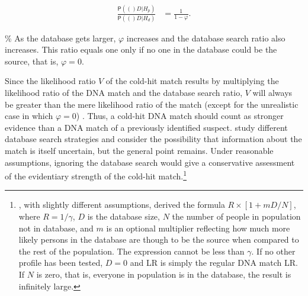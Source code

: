 \documentclass[10pt,dvipsnames,enabledeprecatedfontcommands]{scrartcl}
\newcommand{\pr}[1]{\mathsf{P}(#1)}
\begin{document}
\begin{align*}
\frac{\pr(D\vert H_p)}{\pr(D\vert H_d)} & = \frac{1}{1-\varphi}.
\end{align*}

\% As the database gets larger, \(\varphi\) increases and the database
search ratio also increases. This ratio equals one only if no one in the
database could be the source, that is, \(\varphi=0\).

Since the likelihood ratio \(V\) of the cold-hit match results by
multiplying the likelihood ratio of the DNA match and the database
search ratio, \(V\) will always be greater than the mere likelihood
ratio of the match (except for the unrealistic case in which
\(\varphi=0\)) . Thus, a cold-hit DNA match should count as stronger
evidence than a DNA match of a previously identified suspect.
\citet{dawid1996CoherentAnalysisForensic} study different database
search strategies and consider the possibility that information about
the match is itself uncertain, but the general point remains. Under
reasonable assumptions, ignoring the database search would give a
conservative assessment of the evidentiary strength of the cold-hit
match.\footnote{\citet{donnelly1999DNADatabaseSearches}, with slightly different assumptions, derived the formula $R \times [1+mD/N]$, where $R = 1/\gamma$, $D$ is the database size, $N$ the number of people in population not in database, and $m$ is an optional multiplier reflecting how much more likely persons in the database are though to be the source when compared to the rest of the population. The expression cannot be less than $\gamma$. If no other profile has been tested, $D=0$ and LR is simply the regular DNA match LR. If $N$ is zero, that is, everyone in population is in the database, the result is infinitely large.}
\end{document}
